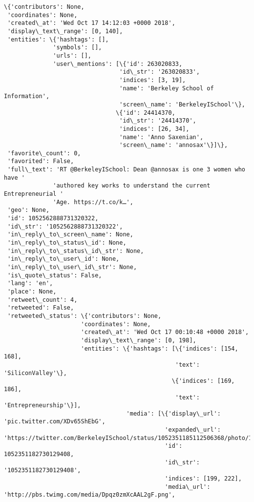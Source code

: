 \documentclass[11pt]{article}
\begin{document}
    \begin{Verbatim}[commandchars=\\\{\}]
\{'contributors': None,
 'coordinates': None,
 'created\_at': 'Wed Oct 17 14:12:03 +0000 2018',
 'display\_text\_range': [0, 140],
 'entities': \{'hashtags': [],
              'symbols': [],
              'urls': [],
              'user\_mentions': [\{'id': 263020833,
                                 'id\_str': '263020833',
                                 'indices': [3, 19],
                                 'name': 'Berkeley School of Information',
                                 'screen\_name': 'BerkeleyISchool'\},
                                \{'id': 24414370,
                                 'id\_str': '24414370',
                                 'indices': [26, 34],
                                 'name': 'Anno Saxenian',
                                 'screen\_name': 'annosax'\}]\},
 'favorite\_count': 0,
 'favorited': False,
 'full\_text': 'RT @BerkeleyISchool: Dean @annosax is one 3 women who have '
              'authored key works to understand the current Entrepreneurial '
              'Age. https://t.co/k…',
 'geo': None,
 'id': 1052562888731320322,
 'id\_str': '1052562888731320322',
 'in\_reply\_to\_screen\_name': None,
 'in\_reply\_to\_status\_id': None,
 'in\_reply\_to\_status\_id\_str': None,
 'in\_reply\_to\_user\_id': None,
 'in\_reply\_to\_user\_id\_str': None,
 'is\_quote\_status': False,
 'lang': 'en',
 'place': None,
 'retweet\_count': 4,
 'retweeted': False,
 'retweeted\_status': \{'contributors': None,
                      'coordinates': None,
                      'created\_at': 'Wed Oct 17 00:10:48 +0000 2018',
                      'display\_text\_range': [0, 198],
                      'entities': \{'hashtags': [\{'indices': [154, 168],
                                                 'text': 'SiliconValley'\},
                                                \{'indices': [169, 186],
                                                 'text': 'Entrepreneurship'\}],
                                   'media': [\{'display\_url': 'pic.twitter.com/XDv65ShEbG',
                                              'expanded\_url': 'https://twitter.com/BerkeleyISchool/status/1052351185112506368/photo/1',
                                              'id': 1052351182730129408,
                                              'id\_str': '1052351182730129408',
                                              'indices': [199, 222],
                                              'media\_url': 'http://pbs.twimg.com/media/Dpqz0zmXcAAL2gF.png',

\end{Verbatim}
\end{document}
